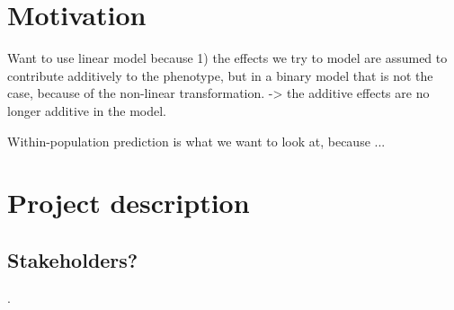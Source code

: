 



\section{Motivation}


Want to use linear model because 1) the effects we try to model are assumed to contribute additively to the phenotype, but in a binary model that is not the case, because of the non-linear transformation. -> the additive effects are no longer additive in the model. 

Within-population prediction is what we want to look at, because ...

\section{Project description}




\subsection{Stakeholders?}

.